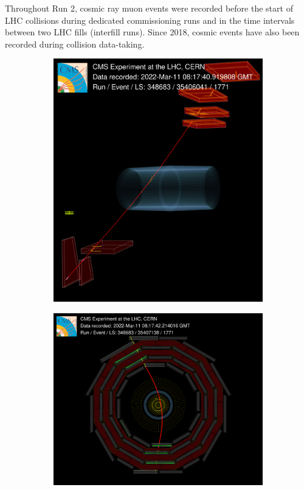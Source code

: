 Throughout Run 2, cosmic ray muon events were recorded before the start of LHC collisions during dedicated commissioning runs and in the time intervals between two LHC fills (interfill runs). Since 2018, cosmic events have also been recorded during collision data-taking.

\begin{figure}[!hbt]
\centering
\begin{subfigure}[t]{0.37\textwidth}
    \includegraphics[width=\textwidth]{figures/CRAFT-2022_1.png}
    \caption{}
    \label{fig:cosmicside}
\end{subfigure}
\begin{subfigure}[t]{0.53\textwidth}
    \includegraphics[width=\textwidth]{figures/CRAFT-2022_0.png}

\end{subfigure}
\end{figure}
